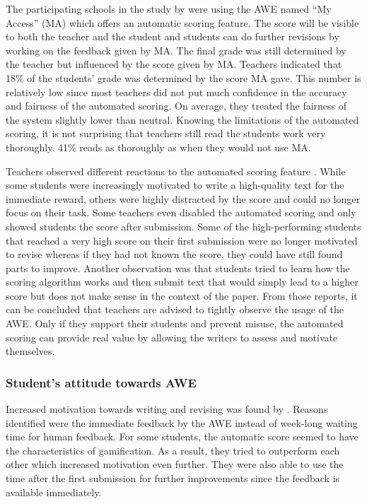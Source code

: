 \documentclass[runningheads]{llncs}
\begin{document}
The participating schools in the study by \textcite{grimes_utility_2010} were using the AWE named ``My Access'' (MA) which offers an automatic scoring feature. The score will be visible to both the teacher and the student and students can do further revisions by working on the feedback given by MA. The final grade was still determined by the teacher but influenced by the score given by MA. Teachers indicated that 18\% of the students' grade was determined by the score MA gave. This number is relatively low since most teachers did not put much confidence in the accuracy and fairness of the automated scoring. On average, they treated the fairness of the system slightly lower than neutral. Knowing the limitations of the automated scoring, it is not surprising that teachers still read the students work very thoroughly. 41\% reads as thoroughly as when they would not use MA. 

Teachers observed different reactions to the automated scoring feature \citep{grimes_utility_2010}. While some students were increasingly motivated to write a high-quality text for the immediate reward, others were highly distracted by the score and could no longer focus on their task. Some teachers even disabled the automated scoring and only showed students the score after submission. Some of the high-performing students that reached a very high score on their first submission were no longer motivated to revise whereas if they had not known the score, they could have still found parts to improve. Another observation was that students tried to learn how the scoring algorithm works and then submit text that would simply lead to a higher score but does not make sense in the context of the paper. From those reports, it can be concluded that teachers are advised to tightly observe the usage of the AWE. Only if they support their students and prevent misuse, the automated scoring can provide real value by allowing the writers to assess and motivate themselves.

\subsubsection{Student's attitude towards AWE}
Increased motivation towards writing and revising was found by \textcite{grimes_utility_2010}. Reasons identified were the immediate feedback by the AWE instead of week-long waiting time for human feedback. For some students, the automatic score seemed to have the characteristics of gamification. As a result, they tried to outperform each other which increased motivation even further. They were also able to use the time after the first submission for further improvements since the feedback is available immediately.
\end{document}
